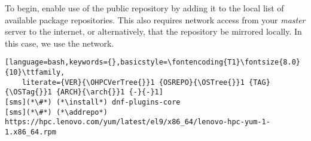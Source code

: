 To begin, enable use of the public \Confluent{} repository by adding it to the local list
of available package repositories. This also requires network access from
your {\em master} server to the internet, or alternatively, that
the repository be mirrored locally. In this case, we use the network.

\begin{lstlisting}[language=bash,keywords={},basicstyle=\fontencoding{T1}\fontsize{8.0}{10}\ttfamily,
	literate={VER}{\OHPCVerTree{}}1 {OSREPO}{\OSTree{}}1 {TAG}{\OSTag{}}1 {ARCH}{\arch{}}1 {-}{-}1]
[sms](*\#*) (*\install*) dnf-plugins-core
[sms](*\#*) (*\addrepo*) https://hpc.lenovo.com/yum/latest/el9/x86_64/lenovo-hpc-yum-1-1.x86_64.rpm
\end{lstlisting}
